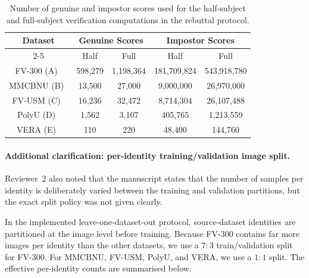 \documentclass[11pt]{article}
\begin{document}
\begin{table}[ht!]
    \centering
    \scriptsize
    \begin{tabular}{|c|c|c|c|c|}
        \hline
        \multirow{2}{*}{Dataset} & \multicolumn{2}{c|}{Genuine Scores} & \multicolumn{2}{c|}{Impostor Scores} \\
        \cline{2-5}
         & Half & Full & Half & Full \\
        \hline
        FV-300 (A)~\cite{veinatnnet} & 598,279 & 1,198,364 & 181,709,824 & 543,918,780 \\
        \hline
        MMCBNU (B)~\cite{mmcbnu} & 13,500 & 27,000 & 9,000,000 & 26,970,000 \\
        \hline
        FV-USM (C)~\cite{fvusm} & 16,236 & 32,472 & 8,714,304 & 26,107,488 \\
        \hline
        PolyU (D)~\cite{polyu} & 1,562 & 3,107 & 405,765 & 1,213,559 \\
        \hline
        VERA (E)~\cite{vera} & 110 & 220 & 48,400 & 144,760 \\
        \hline
    \end{tabular}
    \medskip
    \caption{Number of genuine and impostor scores used for the half-subject and full-subject verification computations in the rebuttal protocol.}
    \label{tab:rebuttal_score_counts}
\end{table}

\paragraph{Additional clarification: per-identity training/validation image split.}

Reviewer~2 also noted that the manuscript states that the number of samples per identity is 
deliberately varied between the training and validation partitions, but the exact split policy was 
not given clearly. 

In the implemented leave-one-dataset-out protocol, source-dataset identities are partitioned at the 
image level before training. Because FV-300 contains far more images per identity than the other 
datasets, we use a $7{:}3$ train/validation split for FV-300. For MMCBNU, FV-USM, PolyU, and VERA, 
we use a $1{:}1$ split. The effective per-identity counts are summarised below.
\end{document}
